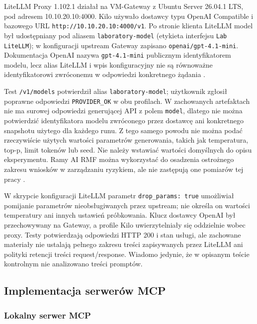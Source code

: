 LiteLLM Proxy 1.102.1 działał na VM-Gateway z Ubuntu Server 26.04.1 LTS,
pod adresem 10.10.20.10:4000. Kilo używało dostawcy typu OpenAI Compatible
i bazowego URL \texttt{http://10.10.20.10:4000/v1}. Po stronie klienta
LiteLLM model był udostępniany pod aliasem \texttt{laboratory-model}
(etykieta interfejsu \texttt{Lab LiteLLM}); w konfiguracji upstream
Gateway zapisano \texttt{openai/gpt-4.1-mini}. Dokumentacja OpenAI nazywa
\texttt{gpt-4.1-mini} publicznym identyfikatorem modelu, lecz alias LiteLLM
i wpis konfiguracyjny nie są równoważne identyfikatorowi zwróconemu w
odpowiedzi konkretnego żądania \cite{OpenAIModelsGPT41Mini,OpenAIChatCompletionsAPI,LiteLLMConfig,LiteLLMVirtualKeys}.

Test \texttt{/v1/models} potwierdził alias \texttt{laboratory-model};
użytkownik zgłosił poprawne odpowiedzi \texttt{PROVIDER\_OK} w obu
profilach. W zachowanych artefaktach nie ma surowej odpowiedzi generującej
API z polem \texttt{model}, dlatego nie można potwierdzić identyfikatora
modelu zwróconego przez dostawcę ani konkretnego snapshotu użytego dla
każdego runu. Z tego samego powodu nie można podać rzeczywiście użytych
wartości parametrów generowania, takich jak temperatura, top-p, limit
tokenów lub seed. Nie należy wstawiać wartości domyślnych do opisu
eksperymentu. Ramy AI RMF można wykorzystać do osadzenia ostrożnego zakresu
wniosków w zarządzaniu ryzykiem, ale nie zastępują one pomiarów tej pracy
\cite{NISTAI1001}.

W skrypcie konfiguracji LiteLLM parametr \texttt{drop\_params: true}
umożliwiał pomijanie parametrów nieobsługiwanych przez upstream; nie
określa on wartości temperatury ani innych ustawień próbkowania. Klucz
dostawcy OpenAI był przechowywany na Gateway, a profile Kilo uwierzytelniały
się oddzielnie wobec proxy. Testy potwierdzają odpowiedzi HTTP 200 i stan
usługi, ale zachowane materiały nie ustalają pełnego zakresu treści
zapisywanych przez LiteLLM ani polityki retencji treści request/response.
Wiadomo jedynie, że w opisanym teście kontrolnym nie analizowano treści
promptów.

\subsection{Implementacja serwerów MCP}
\label{subsec:implementacja-mcp-propozycja}

\subsubsection{Lokalny serwer MCP}
\label{subsubsec:local-mcp-propozycja}

